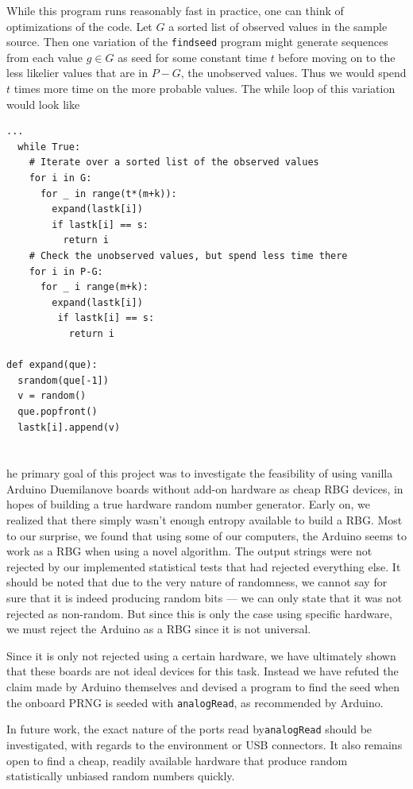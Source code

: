\documentclass[a4paper]{article}           %
\newcommand{\tmpsection}[1]{}
\let\tmpsection=\section
\renewcommand{\section}[2]{

    \ifthenelse{
      \equal{#2}{Heimildir} %
    }
    {
      \tmpsection{\sc{#1} }
      \tmpsection{\sc{#2} }
    }
    {\tmpsection{\sc{#1} } }
      

}
\begin{document}
While this program runs reasonably fast in practice, one can think of optimizations of the code. Let $G$ a sorted list of observed values in the sample source. Then one variation of the \texttt{findseed} program might generate sequences from each value $g \in G$ as seed for some constant time $t$ before moving on to the less likelier values that are in $P-G$, the unobserved values. Thus we would spend $t$ times more time on the more probable values. The while loop of this variation would look like

\begin{lstlisting}[caption=One possible optimization of the \texttt{findseed} program]
...
  while True:
    # Iterate over a sorted list of the observed values
    for i in G:
      for _ in range(t*(m+k)):
        expand(lastk[i])
        if lastk[i] == s:
          return i
    # Check the unobserved values, but spend less time there
    for i in P-G:
      for _ i range(m+k):
        expand(lastk[i])
         if lastk[i] == s:
           return i

def expand(que):
  srandom(que[-1])
  v = random()
  que.popfront()
  lastk[i].append(v)
\end{lstlisting}


\section{Conclusions}

The primary goal of this project was to investigate the feasibility of using vanilla Arduino Duemilanove boards without add-on hardware as cheap RBG devices, in hopes of building a true hardware random number generator. Early on, we realized that there simply wasn't enough entropy available to build a RBG. Most to our surprise, we found that using some of our computers, the Arduino seems to work as a RBG when using a novel algorithm. The output strings were not rejected by our implemented statistical tests that had rejected everything else. It should be noted that due to the very nature of randomness, we cannot say for sure that it is indeed producing random bits --- we can only state that it was not rejected as non-random. But since this is only the case using specific hardware, we must reject the Arduino as a RBG since it is not universal. 


Since it is only not rejected using a certain hardware, we have ultimately shown that these boards are not ideal devices for this task. Instead we have refuted the claim made by Arduino themselves and devised a program to find the seed when the onboard PRNG is seeded with \texttt{analogRead}, as recommended by Arduino. 

In future work, the exact nature of the ports read by\texttt{analogRead} should be investigated, with regards to the environment or USB connectors. It also remains open to find a cheap, readily available hardware that produce random statistically unbiased random numbers quickly. 

{}

\end{document}
